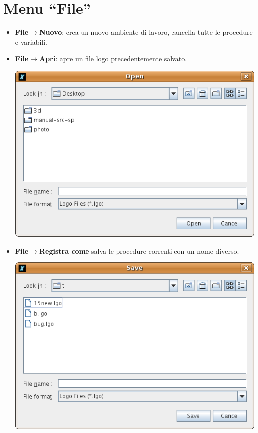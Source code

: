 \section{Menu ``File''}
\begin{itemize}
	\item \textbf{File$\to$Nuovo}: crea un nuovo ambiente di lavoro, cancella tutte le procedure e variabili.
	\item \textbf{File$\to$Apri}: apre un file logo precedentemente salvato.
	\begin{center}
		\includegraphics[scale=0.4]{pics/interface-CaptureOpen.png}
	\end{center}
	\vspace{0.25cm}
	\item \textbf{File$\to$Registra come\textellipsis} salva le procedure correnti con un nome diverso.
	\begin{center}
		\includegraphics[scale=0.4]{pics/interface-CaptureSave.png}

\end{center}
\end{itemize}
